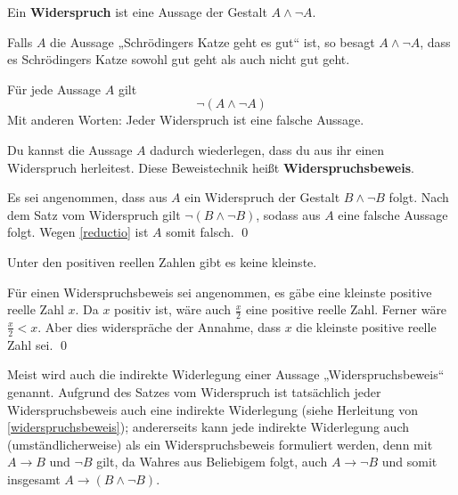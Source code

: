 \begin{de} 
    Ein \textbf{Widerspruch} ist eine Aussage der Gestalt $A\land \neg A$.
\end{de}


\begin{bsp}
    Falls $A$ die Aussage „Schrödingers Katze geht es gut“ ist, so besagt $A\land \neg A$, dass es Schrödingers Katze sowohl gut geht als auch nicht gut geht.
\end{bsp}


\begin{axiom} 
    Für jede Aussage $A$ gilt
        \[ \neg(A\land \neg A) \]
    Mit anderen Worten: Jeder Widerspruch ist eine falsche Aussage.
\end{axiom}


\begin{satz} \label{widerspruchsbeweis} 
    Du kannst die Aussage $A$ dadurch wiederlegen, dass du aus ihr einen Widerspruch herleitest. Diese Beweistechnik heißt \textbf{Widerspruchsbeweis}.
\end{satz}


\begin{bew}
    Es sei angenommen, dass aus $A$ ein Widerspruch der Gestalt $B\land \neg B$ folgt. Nach dem Satz vom Widerspruch gilt $\neg (B\land \neg B)$, sodass aus $A$ eine falsche Aussage folgt. Wegen \cref{reductio} ist $A$ somit falsch. \qed
\end{bew}

  
\begin{bsp} \label{bsp:widerspruchsbeweis}
    Unter den positiven reellen Zahlen gibt es keine kleinste.
\end{bsp}


\begin{bew}
    Für einen Widerspruchsbeweis sei angenommen, es gäbe eine kleinste positive reelle Zahl $x$. Da $x$ positiv ist, wäre auch $\frac{x}{2}$ eine positive reelle Zahl. Ferner wäre $\frac{x}{2}<x$. Aber dies widerspräche der Annahme, dass $x$ die kleinste positive reelle Zahl sei. \qed
\end{bew}
  
  
\begin{bem}
    Meist wird auch die indirekte Widerlegung einer Aussage „Widerspruchsbeweis“ genannt. Aufgrund des Satzes vom Widerspruch ist tatsächlich jeder Widerspruchsbeweis auch eine indirekte Widerlegung (siehe Herleitung von \cref{widerspruchsbeweis}); andererseits kann jede indirekte Widerlegung auch (umständlicherweise) als ein Widerspruchsbeweis formuliert werden, denn mit $A\to B$ und $\neg B$ gilt, da Wahres aus Beliebigem folgt, auch $A\to \neg B$ und somit insgesamt $A\to (B\land \neg B)$.
\end{bem}


